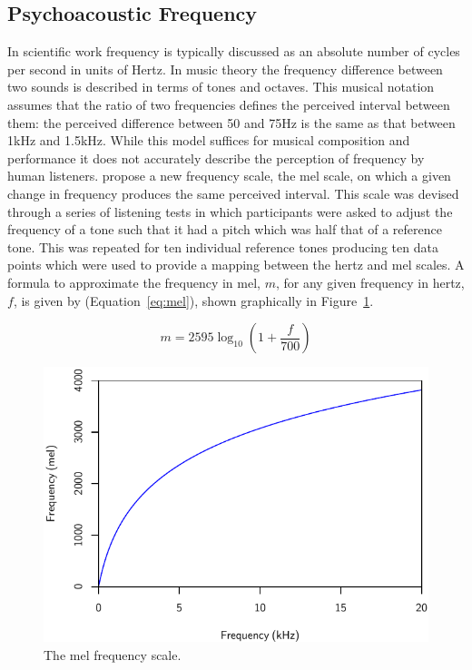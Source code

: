 	\subsection{Psychoacoustic Frequency}
	\label{sec:Timbre-PsychoacousticPrinciples-Frequency}
		In scientific work frequency is typically discussed as an absolute number of cycles per second in units of
		Hertz. In music theory the frequency difference between two sounds is described in terms of tones and
		octaves.  This musical notation assumes that the ratio of two frequencies defines the perceived interval
		between them: the perceived difference between 50 and 75Hz is the same as that between 1kHz and 1.5kHz.
		While this model suffices for musical composition and performance it does not accurately describe the
		perception of frequency by human listeners. \citet{stevens1937a} propose a new frequency scale, the mel
		scale, on which a given change in frequency produces the same perceived interval. This scale was devised
		through a series of listening tests in which participants were asked to adjust the frequency of a tone such
		that it had a pitch which was half that of a reference tone. This was repeated for ten individual reference
		tones producing ten data points which were used to provide a mapping between the hertz and mel scales. A
		formula to approximate the frequency in mel, $m$, for any given frequency in hertz, $f$, is given by
		\citet{oshaughnessy2000speech} (Equation~\ref{eq:mel}), shown graphically in Figure~\ref{fig:MelScale}.

		\begin{equation}
			m = 2595 \log_{10} \left(1 + \frac{f}{700} \right)
			\label{eq:mel}
		\end{equation}

		\begin{figure}[h!]
			\centering
			\includegraphics{chapter2/Images/MelScale.pdf}
			\caption{The mel frequency scale.}
			\label{fig:MelScale}
		\end{figure}

